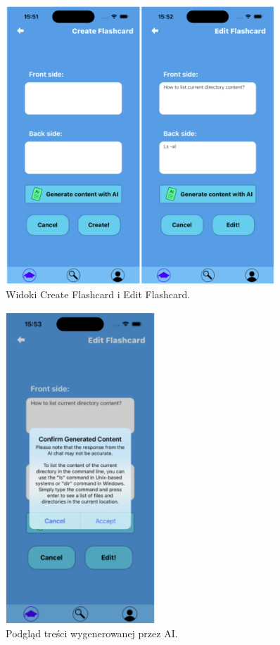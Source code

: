 \begin{figure}[H]
    \centering
    \includegraphics[width=0.9\textwidth]{chapters/chapter_10/images_mobile/mobile_create_flashcards}
    \caption{Widoki Create Flashcard i Edit Flashcard.}
    \label{img:mobile_create_flashcards}
\end{figure}


\begin{figure}[H]
    \centering
    \includegraphics[width=0.5\textwidth]{chapters/chapter_10/images_mobile/mobile_chat}
    \caption{Podgląd treści wygenerowanej przez AI.}
    \label{img:mobile_chat}
\end{figure}


